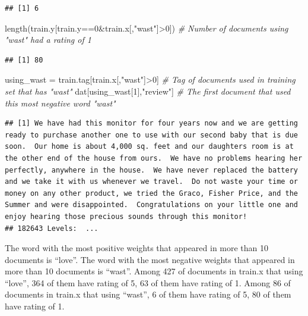 \documentclass[
]{article}
\newenvironment{Shaded}{\begin{snugshade}}{\end{snugshade}}
\newcommand{\CommentTok}[1]{\textcolor[rgb]{0.56,0.35,0.01}{\textit{#1}}}
\newcommand{\DecValTok}[1]{\textcolor[rgb]{0.00,0.00,0.81}{#1}}
\newcommand{\FunctionTok}[1]{\textcolor[rgb]{0.00,0.00,0.00}{#1}}
\newcommand{\NormalTok}[1]{#1}
\newcommand{\OtherTok}[1]{\textcolor[rgb]{0.56,0.35,0.01}{#1}}
\newcommand{\SpecialCharTok}[1]{\textcolor[rgb]{0.00,0.00,0.00}{#1}}
\newcommand{\StringTok}[1]{\textcolor[rgb]{0.31,0.60,0.02}{#1}}
\begin{document}
\begin{verbatim}
## [1] 6
\end{verbatim}

\begin{Shaded}
\begin{Highlighting}[]
\FunctionTok{length}\NormalTok{(train.y[train.y}\SpecialCharTok{==}\DecValTok{0}\SpecialCharTok{\&}\NormalTok{train.x[,}\StringTok{"wast"}\NormalTok{]}\SpecialCharTok{\textgreater{}}\DecValTok{0}\NormalTok{]) }\CommentTok{\# Number of documents using "wast" had a rating of 1}
\end{Highlighting}
\end{Shaded}

\begin{verbatim}
## [1] 80
\end{verbatim}

\begin{Shaded}
\begin{Highlighting}[]
\NormalTok{using\_wast }\OtherTok{=}\NormalTok{ train.tag[train.x[,}\StringTok{"wast"}\NormalTok{]}\SpecialCharTok{\textgreater{}}\DecValTok{0}\NormalTok{] }\CommentTok{\# Tag of documents used in training set that has "wast"}
\NormalTok{dat[using\_wast[}\DecValTok{1}\NormalTok{],}\StringTok{"review"}\NormalTok{] }\CommentTok{\# The first document that used this most negative word "wast"}
\end{Highlighting}
\end{Shaded}

\begin{verbatim}
## [1] We have had this monitor for four years now and we are getting ready to purchase another one to use with our second baby that is due soon.  Our home is about 4,000 sq. feet and our daughters room is at the other end of the house from ours.  We have no problems hearing her perfectly, anywhere in the house.  We have never replaced the battery and we take it with us whenever we travel.  Do not waste your time or money on any other product, we tried the Graco, Fisher Price, and the Summer and were disappointed.  Congratulations on your little one and enjoy hearing those precious sounds through this monitor!
## 182643 Levels:  ...
\end{verbatim}

The word with the most positive weights that appeared in more than 10
documents is ``love''. The word with the most negative weights that
appeared in more than 10 documents is ``wast''. Among 427 of documents
in train.x that using ``love'', 364 of them have rating of 5, 63 of them
have rating of 1. Among 86 of documents in train.x that using ``wast'',
6 of them have rating of 5, 80 of them have rating of 1.
\end{document}
